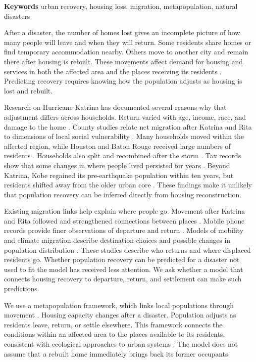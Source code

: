 \documentclass[11pt]{article}
\begin{document}
\noindent\textbf{Keywords} urban recovery, housing loss, migration, metapopulation, natural disasters

After a disaster, the number of homes lost gives an incomplete picture of how many people will leave and when they will return. Some residents share homes or find temporary accommodation nearby. Others move to another city and remain there after housing is rebuilt. These movements affect demand for housing and services in both the affected area and the places receiving its residents \citep{Levine2007,Peacock2014}. Predicting recovery requires knowing how the population adjusts as housing is lost and rebuilt.

Research on Hurricane Katrina has documented several reasons why that adjustment differs across households. Return varied with age, income, race, and damage to the home \citep{Fussell2010,GroenPolivka2010}. County studies relate net migration after Katrina and Rita to dimensions of local social vulnerability \citep{Myers2008}. Many households moved within the affected region, while Houston and Baton Rouge received large numbers of residents \citep{SastryGregory2014,Hori2009}. Households also split and recombined after the storm \citep{Rendall2011}. Tax records show that some changes in where people lived persisted for years \citep{Deryugina2018}. Beyond Katrina, Kobe regained its pre-earthquake population within ten years, but residents shifted away from the older urban core \citep{Chang2010}. These findings make it unlikely that population recovery can be inferred directly from housing reconstruction.

Existing migration links help explain where people go. Movement after Katrina and Rita followed and strengthened connections between places \citep{Curtis2015,DeWaard2016}. Mobile phone records provide finer observations of departure and return \citep{Lu2012,Yabe2020}. Models of mobility and climate migration describe destination choices and possible changes in population distribution \citep{Simini2012,Hauer2017,Robinson2020}. These studies describe who returns and where displaced residents go. Whether population recovery can be predicted for a disaster not used to fit the model has received less attention. We ask whether a model that connects housing recovery to departure, return, and settlement can make such predictions.

We use a metapopulation framework, which links local populations through movement \citep{Levins1969,Hanski1998}. Housing capacity changes after a disaster. Population adjusts as residents leave, return, or settle elsewhere. This framework connects the conditions within an affected area to the places available to its residents, consistent with ecological approaches to urban systems \citep{Grimm2008,Seto2012,Espey2024}. The model does not assume that a rebuilt home immediately brings back its former occupants.
\end{document}
